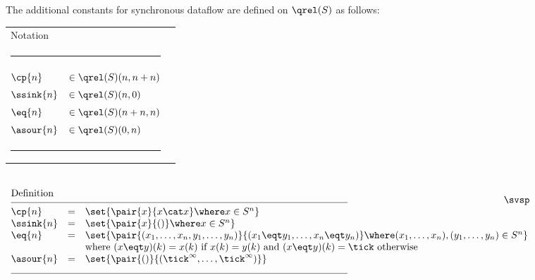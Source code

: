 \documentclass[fleqn]{llncs}
\begin{document}
The additional constants for synchronous dataflow are defined on
$\qrel(S)$ as follows:
\begin{center}
\footnotesize
\begin{tabular}{lll}
\multicolumn{2}{l}{Notation} \\[-1.25ex]
\multicolumn{2}{l}{\rule{.99\textwidth}{.125mm}} \svsp \\
 $\cp{n}$     & $\in \qrel(S)(n,n+n)$           \\
 $\ssink{n}$  & $\in \qrel (S)(n,0)$            \\
 $\eq{n}$     & $\in \qrel(S)(n+n,n)$           \\
 $\asour{n}$  & $\in \qrel (S)(0,n)$            \\
\multicolumn{2}{l}{\rule{.99\textwidth}{.125mm}}
\end{tabular}
\svsp \\
$
\begin{array}{lll}
\multicolumn{3}{l}{\mbox{Definition}} \\[-1.25ex]
\multicolumn{3}{l}{\rule{.99\textwidth}{.125mm}} \svsp \\
\cp{n}     & = & \set{\pair{x}{x \cat x} \where x \in S^n} \\
\ssink{n}  & = & \set{\pair{x}{()}   \where x \in S^n} \\
\eq{n}     & = &
\set{\pair{(x_1,\ldots,x_n,y_1,\dots,y_n)}{(x_1 \eqt y_1,\dots,x_n \eqt y_n)}
     \where (x_1,\ldots,x_n), (y_1,\dots,y_n) \in S^n} \\
           &   &
\mbox{where  $(x \eqt y)(k) = x(k)$  if $x(k) = y(k)$ and
             $(x \eqt y)(k) = \tick$ otherwise} \\
\asour{n}  & = & \set{\pair{()}{(\tick^\infty,\ldots,\tick^\infty)}} \\
\multicolumn{3}{l}{\rule{.99\textwidth}{.125mm}}
\end{array}
$
\end{center}
\edfn
\end{document}

